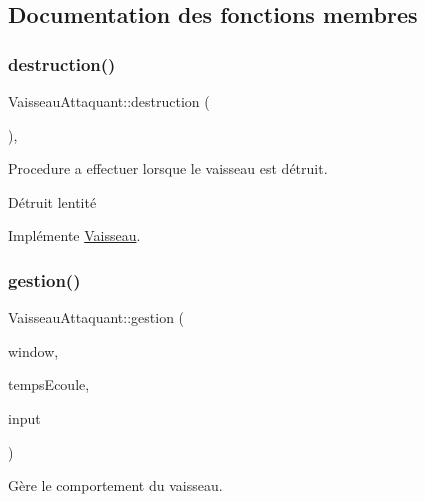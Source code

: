 \subsection{Documentation des fonctions membres}
\mbox{\label{class_vaisseau_attaquant_af804e1fd491301c2385e10d88f4892a6}} 
\subsubsection{\texorpdfstring{destruction()}{destruction()}}
{\footnotesize\ttfamily Vaisseau\+Attaquant\+::destruction (\begin{DoxyParamCaption}{ }\end{DoxyParamCaption})\hspace{0.3cm}{\ttfamily [inline]}, {\ttfamily [virtual]}}



Procedure a effectuer lorsque le vaisseau est détruit. 

Détruit l\textquotesingle{}entité 

Implémente \hyperlink{class_vaisseau_af4f490c5fd9e171b23067ec73aa737ad}{Vaisseau}.

\mbox{\label{class_vaisseau_attaquant_ad95d76e5973affa6ef287edd7ad5310e}} 
\subsubsection{\texorpdfstring{gestion()}{gestion()}}
{\footnotesize\ttfamily Vaisseau\+Attaquant\+::gestion (\begin{DoxyParamCaption}\item[{sf\+::\+Render\+Window \&}]{window,  }\item[{sf\+::\+Time}]{temps\+Ecoule,  }\item[{\hyperlink{_input_8h_a5588d60d674991c719a8df848313e966}{Input} \&}]{input }\end{DoxyParamCaption})\hspace{0.3cm}{\ttfamily [virtual]}}



Gère le comportement du vaisseau. 


